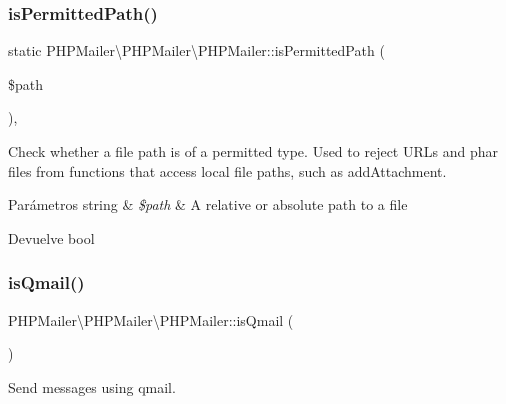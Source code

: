 \subsubsection{\texorpdfstring{is\+Permitted\+Path()}{isPermittedPath()}}
{\footnotesize\ttfamily static P\+H\+P\+Mailer\textbackslash{}\+P\+H\+P\+Mailer\textbackslash{}\+P\+H\+P\+Mailer\+::is\+Permitted\+Path (\begin{DoxyParamCaption}\item[{}]{\$path }\end{DoxyParamCaption})\hspace{0.3cm}{\ttfamily [static]}, {\ttfamily [protected]}}

Check whether a file path is of a permitted type. Used to reject U\+R\+Ls and phar files from functions that access local file paths, such as add\+Attachment.


\begin{DoxyParams}[1]{Parámetros}
string & {\em \$path} & A relative or absolute path to a file\\
\hline
\end{DoxyParams}
\begin{DoxyReturn}{Devuelve}
bool 
\end{DoxyReturn}
\mbox{\label{classPHPMailer_1_1PHPMailer_1_1PHPMailer_a97b8e092331ece317fbf9f54aa5f4a26}} 
\subsubsection{\texorpdfstring{is\+Qmail()}{isQmail()}}
{\footnotesize\ttfamily P\+H\+P\+Mailer\textbackslash{}\+P\+H\+P\+Mailer\textbackslash{}\+P\+H\+P\+Mailer\+::is\+Qmail (\begin{DoxyParamCaption}{ }\end{DoxyParamCaption})}

Send messages using qmail. \mbox{\label{classPHPMailer_1_1PHPMailer_1_1PHPMailer_a21b42f88f6fa9ca1866c5810a03e780c}} 
